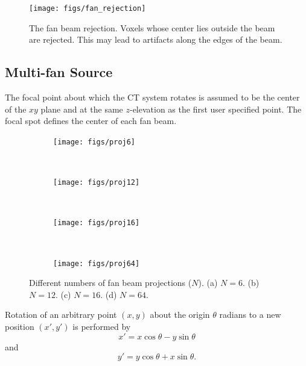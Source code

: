 \begin{figure}[tb]
  \begin{center}
   \texttt{[image: figs/fan\_rejection]}
  \end{center}
  \caption{The fan beam rejection. Voxels whose center lies outside the beam are rejected. This may lead to artifacts along the edges of the beam.}
\label{fig:fan_rejection}
\end{figure}

\subsection{Multi-fan Source}
The focal point about which the CT system rotates is assumed to be the center of the $xy$ plane and at the same $z$-elevation as the first user specified point. The focal spot defines the center of each fan beam.

\begin{figure}
    \centering
    \begin{subfigure}[b]{0.2\textwidth}
        \texttt{[image: figs/proj6]}
        \caption{}
        \label{fig:proj6}
    \end{subfigure}
    ~ 
    \begin{subfigure}[b]{0.2\textwidth}
        \texttt{[image: figs/proj12]}
        \caption{}
        \label{fig:proj12}
    \end{subfigure}
    ~ 
    \begin{subfigure}[b]{0.2\textwidth}
        \texttt{[image: figs/proj16]}
        \caption{}
        \label{fig:proj16}
    \end{subfigure}
    ~
    \begin{subfigure}[b]{0.2\textwidth}
        \texttt{[image: figs/proj64]}
        \caption{}
        \label{fig:proj24}
    \end{subfigure}
    \caption{Different numbers of fan beam projections ($N$). (a) $N = 6$. (b) $N = 12$. (c) $N = 16$. (d) $N = 64$.}\label{fig:fanproj}
\end{figure}

Rotation of an arbitrary point $(x,y)$ about the origin $\theta$ radians to a new position $(x', y')$ is performed by
\begin{equation}\label{eq:xp}
x' = x \cos \theta - y \sin \theta
\end{equation}
and
\begin{equation}\label{eq:yp}
y' = y \cos \theta + x \sin \theta.
\end{equation}

